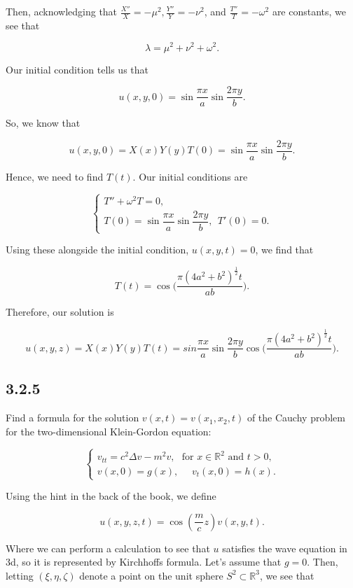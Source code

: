 \documentclass{article}
\begin{document}
Then, acknowledging that $\frac{X''}{X}=-\mu^2, \frac{Y''}{Y}=-\nu^2$, and $\frac{T''}{T}=-\omega^2$ are constants, we see that

$$\lambda=\mu^2+\nu^2 + \omega^2.$$

Our initial condition tells us that

$$u(x,y,0)=\sin{\dfrac{\pi x}{a}}\sin{\dfrac{2\pi y}{b}}.$$

So, we know that

$$u(x,y,0)=X(x)Y(y)T(0)=\sin{\dfrac{\pi x}{a}}\sin{\dfrac{2\pi y}{b}}.$$

Hence, we need to find $T(t)$. Our initial conditions are

\[
  \begin{cases}
  T''+\omega^2 T=0, \\
  T(0)=\sin{\dfrac{\pi x}{a}}\sin{\dfrac{2\pi y}{b}},~~ T'(0)=0.
  \end{cases}
\]

Using these alongside the initial condition, $u(x,y,t)=0$, we find that

$$T(t)=\cos\bigg(\frac{\pi(4a^2+b^2)^{\frac{1}{2}}t}{ab}\bigg).$$

Therefore, our solution is

$$u(x,y,z)=X(x)Y(y)T(t)=sin{\dfrac{\pi x}{a}}\sin{\dfrac{2\pi y}{b}}\cos\bigg(\frac{\pi(4a^2+b^2)^{\frac{1}{2}}t}{ab}\bigg).$$

\subsection{\textbf{3.2.5}} Find a formula for the solution $v(x,t)=v(x_1,x_2,t)$ of the Cauchy problem for the two-dimensional Klein-Gordon equation:

\[
  \begin{cases}
  v_{tt}=c^2\Delta v - m^2v, ~~~ \text{for $x\in\mathbb R^2$ and $t>0$}, \\
  v(x,0)=g(x),~~~~~~v_t(x,0)=h(x).
  \end{cases}
\]

Using the hint in the back of the book, we define

$$u(x,y,z,t)=\cos\left(\frac{m}{c}z\right)v(x,y,t).$$

Where we can perform a calculation to see that $u$ satisfies the wave equation in 3d, so it is represented by Kirchhoff\textsc{}s formula. Let's assume that $g=0$. Then, letting $(\xi,\eta,\zeta)$ denote a point on the unit sphere $S^2\subset\mathbb R^3$, we see that
\end{document}
